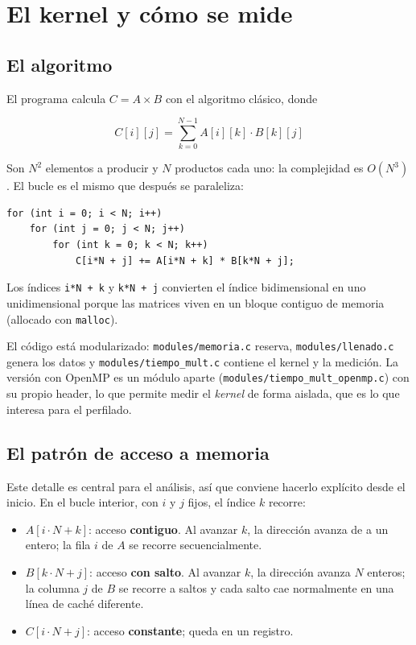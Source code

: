 \section{El kernel y cómo se mide}

\subsection{El algoritmo}

El programa calcula $C = A \times B$ con el algoritmo clásico, donde

\[
C[i][j] = \sum_{k=0}^{N-1} A[i][k] \cdot B[k][j]
\]

Son $N^2$ elementos a producir y $N$ productos cada uno: la complejidad es $O(N^3)$. El bucle es el mismo que después se paraleliza:

\begin{verbatim}
for (int i = 0; i < N; i++)
    for (int j = 0; j < N; j++)
        for (int k = 0; k < N; k++)
            C[i*N + j] += A[i*N + k] * B[k*N + j];
\end{verbatim}

Los índices \texttt{i*N + k} y \texttt{k*N + j} convierten el índice bidimensional en uno unidimensional porque las matrices viven en un bloque contiguo de memoria (allocado con \texttt{malloc}).

El código está modularizado: \texttt{modules/memoria.c} reserva, \texttt{modules/llenado.c} genera los datos y \texttt{modules/tiempo\_mult.c} contiene el kernel y la medición. La versión con OpenMP es un módulo aparte (\texttt{modules/tiempo\_mult\_openmp.c}) con su propio header, lo que permite medir el \emph{kernel} de forma aislada, que es lo que interesa para el perfilado.

\subsection{El patrón de acceso a memoria}

Este detalle es central para el análisis, así que conviene hacerlo explícito desde el inicio. En el bucle interior, con $i$ y $j$ fijos, el índice $k$ recorre:

\begin{itemize}
    \item $A[i \cdot N + k]$: acceso \textbf{contiguo}. Al avanzar $k$, la dirección avanza de a un entero; la fila $i$ de $A$ se recorre secuencialmente.
    \item $B[k \cdot N + j]$: acceso \textbf{con salto}. Al avanzar $k$, la dirección avanza $N$ enteros; la columna $j$ de $B$ se recorre a saltos y cada salto cae normalmente en una línea de caché diferente.
    \item $C[i \cdot N + j]$: acceso \textbf{constante}; queda en un registro.
\end{itemize}

